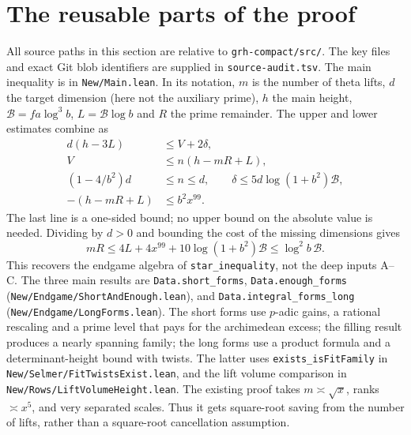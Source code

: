 \documentclass[11pt]{article}
\theoremstyle{remark}\newtheorem{remark}[theorem]{Remark}
\newcommand{\up}{\texttt{grh-compact/src/}}
\begin{document}
\section{The reusable parts of the proof}
All source paths in this section are relative to \up. The key files and exact Git blob identifiers are supplied in \texttt{source-audit.tsv}. The main inequality is in \texttt{New/Main.lean}. In its notation, $m$ is the number of theta lifts, $d$ the target dimension (here not the auxiliary prime), $h$ the main height, $\mathcal B=fa\log^3 b$, $L=\mathcal B\log b$ and $R$ the prime remainder. The upper and lower estimates combine as
\begin{align*}
d(h-3L)&\le V+2\delta,\\
V&\le n(h-mR+L),\\
(1-4/b^2)d&\le n\le d,\qquad
\delta\le 5d\log(1+b^2)\mathcal B,\\
-(h-mR+L)&\le b^2x^{99}.
\end{align*}
The last line is a one-sided bound; no upper bound on the absolute value is needed. Dividing by $d>0$ and bounding the cost of the missing dimensions gives
\begin{equation}\label{eq:budget}
mR\le 4L+4x^{99}+10\log(1+b^2)\mathcal B\le \log^2 b\,\mathcal B.
\end{equation}
This recovers the endgame algebra of \texttt{star\_inequality}, not the deep inputs A--C. The three main results are \texttt{Data.short\_forms}, \texttt{Data.enough\_forms} (\nolinkurl{New/Endgame/ShortAndEnough.lean}), and \nolinkurl{Data.integral_forms_long} (\nolinkurl{New/Endgame/LongForms.lean}). The short forms use $p$-adic gains, a rational rescaling and a prime level that pays for the archimedean excess; the filling result produces a nearly spanning family; the long forms use a product formula and a determinant-height bound with twists. The latter uses \texttt{exists\_isFitFamily} in \nolinkurl{New/Selmer/FitTwistsExist.lean}, and the lift volume comparison in \nolinkurl{New/Rows/LiftVolumeHeight.lean}. The existing proof takes $m\asymp\sqrt{x}$, ranks $\asymp x^5$, and very separated scales. Thus it gets square-root saving from the number of lifts, rather than a square-root cancellation assumption.
\end{document}
